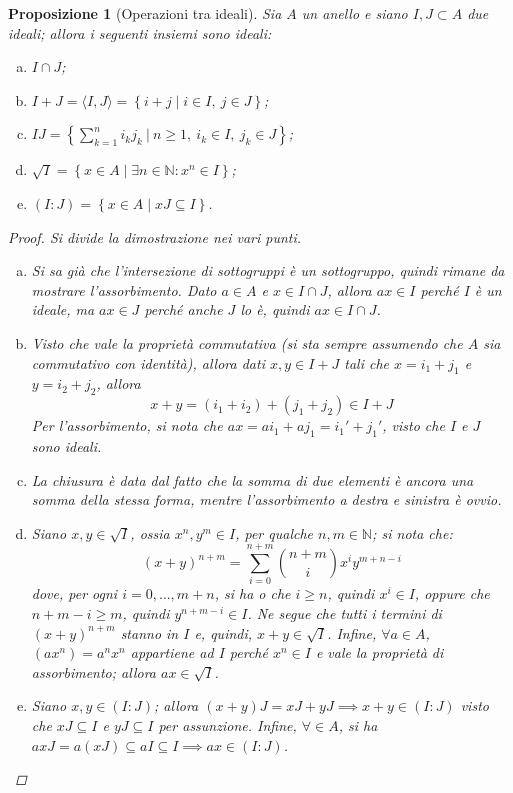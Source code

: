 \documentclass[11pt]{scrartcl}
\theoremstyle{style1}
\newtheorem{prop}{Proposizione}[section]
\numberwithin{equation}{subsection}
\begin{document}
\begin{prop}
	[Operazioni tra ideali]
	Sia $A$ un anello e siano $I,J \subset A$ due ideali; allora i seguenti insiemi sono ideali:
	\begin{enumerate}[(a).]
		\item $I\cap J$;
		\item $I+J = \langle I,J \rangle = \left\{ i + j  \mid i \in I, \ j \in J \right\} $;
		\item $IJ = \left\{ \sum_{k=1}^{n} i_k j_k\ \Big\lvert\ n\ge 1,\ i_k \in I, \ j_k \in J \right\} $;
		\item $\sqrt{I} = \left\{ x \in A  \mid \exists n \in \mathbb{N} : x^n \in I \right\} $;
		\item $(I:J) = \left\{ x \in A  \mid  xJ \subseteq I \right\} $.
	\end{enumerate}
	\begin{proof}
		Si divide la dimostrazione nei vari punti.
		\begin{enumerate}[(a).]
			\item Si sa gi\`a che l'intersezione di sottogruppi \`e un sottogruppo, quindi rimane da mostrare l'assorbimento.
				Dato $a \in A$ e $x \in I \cap J$, allora $ax \in I$ perch\'e $I$ \`e un ideale, ma $ax \in J$ perch\'e anche $J$ lo \`e, quindi $ax \in I \cap J$.
			\item Visto che vale la propriet\`a commutativa (si sta sempre assumendo che $A$ sia commutativo con identit\`a), allora dati $x, y \in I+J$ tali che $x = i_1 + j_1$ e $y = i_2+j_2$, allora
				\[
				x + y = (i_1+i_2)+(j_1+j_2) \in I+J
				\] 
				Per l'assorbimento, si nota che $ax = ai_1 + aj_1 = i_1' + j_1'$, visto che $I$ e $J$ sono ideali.
			\item La chiusura \`e data dal fatto che la somma di due elementi \`e ancora una somma della stessa forma, mentre l'assorbimento a destra e sinistra \`e ovvio.
			\item Siano $x,y \in \sqrt{I} $, ossia $x^n , y ^m \in I$, per qualche $n,m\in \mathbb{N}$; si nota che:
				\[
					(x+y)^{n+m} = \sum_{i=0}^{n+m} \binom{n+m}{i} x^i y^{m+n - i}
				\] 
				dove, per ogni $i= 0,\ldots,m+n$, si ha o che $i\ge n$, quindi $x^i \in I$, oppure che $n+m -i \ge m$, quindi $y^{n+m-i } \in I$.
				Ne segue che tutti i termini di $(x+y)^{n+m} $ stanno in $I$ e, quindi, $x+y \in \sqrt{I} $.
				Infine, $\forall  a \in A$, $(ax^n) = a^n x^n$ appartiene ad $I$ perch\'e $x^n \in I$ e vale la propriet\`a di assorbimento; allora $ax \in \sqrt{I} $.
			\item Siano $x,y \in (I:J)$; allora $(x+y) J = xJ + yJ \implies x+y \in (I:J)$ visto che $xJ \subseteq I$ e $yJ \subseteq I$ per assunzione.
				Infine, $\forall  \in A$, si ha $axJ = a(xJ) \subseteq aI \subseteq I \implies ax \in (I:J)$.
		\end{enumerate}
	\end{proof}
\end{prop}
\end{document}
